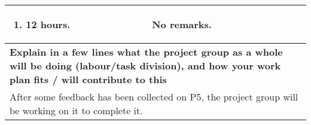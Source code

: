 \documentclass[a4paper]{article}
\begin{document}
\begin{center}
\begin{tabular}{ | p{6cm} | p{6cm} | p{6cm} | p{6cm} | }
    \begin{enumerate}
      \item 12 hours.
    \end{enumerate} &
    \multicolumn{2}{|p{12cm}|}{No remarks.} \\
    \hline
    \multicolumn{4}{|p{24cm}|}{\textbf{Explain in a few lines what the project
    group as a whole will be doing (labour/task division), and how your work
    plan fits / will contribute to this}} \\
    \multicolumn{4}{|p{24cm}|}{After some feedback has been collected on P5,
    the project group will be working on it to complete it.} \\
    \hline
  \end{tabular}
  \egroup
\end{center}
\end{document}
